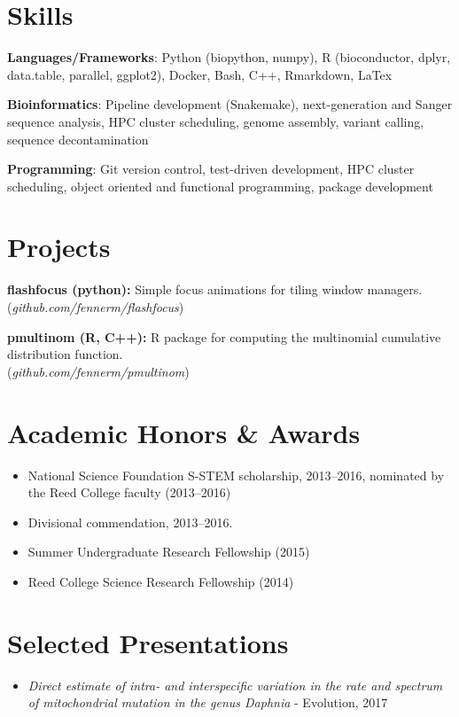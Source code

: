 \documentclass {article}
\newenvironment{lItemize} {
   \begin{itemize}%
      \setlength{\itemsep}{0pt}%
      \setlength{\topsep}{0pt}
      \setlength{\partopsep}{0pt}
      \setlength{\parsep}{0pt}
      \setlength{\parskip}{0pt}%
      \vspace{2mm}
} {\end{itemize}}
\newcommand{\mainsection}[1]{\section*{#1}\titlerule\vspace{1mm}}
\newcommand{\link}[1]{(\textit{#1})}
\newcommand{\project}[3]{\item \textbf{#1 (#2):} #3}
\newcommand{\skill}[2]{\item \textbf{#1}: #2}
\begin{document}
\mainsection{Skills}
\skill{Languages/Frameworks} {Python (biopython, numpy), R (bioconductor, dplyr,
data.table, parallel, ggplot2), Docker, Bash, C++, Rmarkdown, LaTex}
\skill{Bioinformatics}{Pipeline development (Snakemake), next-generation
   and Sanger sequence analysis, HPC cluster scheduling, genome assembly,
variant calling, sequence decontamination}
\skill{Programming}{Git version control, test-driven development, HPC cluster
scheduling, object oriented and functional programming, package development}

\mainsection{Projects}
\project{flashfocus}{python} {Simple focus animations for tiling window
managers. \\\link{github.com/fennerm/flashfocus}}
\project{pmultinom}{R, C++} {R package for computing the multinomial
cumulative distribution function. \\\link{github.com/fennerm/pmultinom}}

\mainsection{Academic Honors \& Awards}
\begin{lItemize}
\item National Science Foundation S-STEM scholarship, 2013--2016, nominated
   by the Reed College faculty (2013--2016)
\item Divisional commendation, 2013--2016.
\item Summer Undergraduate Research Fellowship (2015)
\item Reed College Science Research Fellowship (2014)
\end{lItemize}

\mainsection{Selected Presentations}
\begin{lItemize}
\item{\textit{Direct estimate of intra- and interspecific variation in the
      rate and spectrum of mitochondrial mutation in the genus Daphnia}
   - Evolution, 2017}
\end{lItemize}
\end{document}
